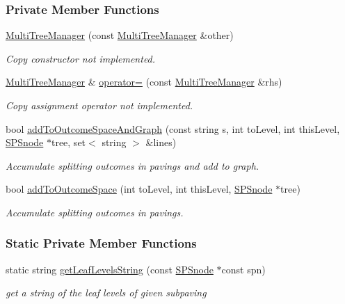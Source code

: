 \subsubsection*{\-Private \-Member \-Functions}
\begin{DoxyCompactItemize}
\item 
\hyperlink{classMultiTreeManager_a2d48afc2b0c1ee16a512e016cc871643}{\-Multi\-Tree\-Manager} (const \hyperlink{classMultiTreeManager}{\-Multi\-Tree\-Manager} \&other)
\begin{DoxyCompactList}\small\item\em \-Copy constructor not implemented. \end{DoxyCompactList}\item 
\hyperlink{classMultiTreeManager}{\-Multi\-Tree\-Manager} \& \hyperlink{classMultiTreeManager_a7efa564054ab02d135e76c070431c651}{operator=} (const \hyperlink{classMultiTreeManager}{\-Multi\-Tree\-Manager} \&rhs)
\begin{DoxyCompactList}\small\item\em \-Copy assignment operator not implemented. \end{DoxyCompactList}\item 
bool \hyperlink{classMultiTreeManager_abb477bda6e195ddd91b4f4cf41f90114}{add\-To\-Outcome\-Space\-And\-Graph} (const string s, int to\-Level, int this\-Level, \hyperlink{classsubpavings_1_1SPSnode}{\-S\-P\-Snode} $\ast$tree, set$<$ string $>$ \&lines)
\begin{DoxyCompactList}\small\item\em \-Accumulate splitting outcomes in pavings and add to graph. \end{DoxyCompactList}\item 
bool \hyperlink{classMultiTreeManager_a6661b18a6941311bb5c7ca2d7c6ee10a}{add\-To\-Outcome\-Space} (int to\-Level, int this\-Level, \hyperlink{classsubpavings_1_1SPSnode}{\-S\-P\-Snode} $\ast$tree)
\begin{DoxyCompactList}\small\item\em \-Accumulate splitting outcomes in pavings. \end{DoxyCompactList}\end{DoxyCompactItemize}
\subsubsection*{\-Static \-Private \-Member \-Functions}
\begin{DoxyCompactItemize}
\item 
static string \hyperlink{classMultiTreeManager_aa0eccb6e029837f3b25c5a80f55e9990}{get\-Leaf\-Levels\-String} (const \hyperlink{classsubpavings_1_1SPSnode}{\-S\-P\-Snode} $\ast$const spn)
\begin{DoxyCompactList}\small\item\em get a string of the leaf levels of given subpaving \end{DoxyCompactList}\end{DoxyCompactItemize}
